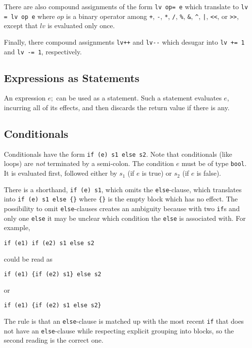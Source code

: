 \documentclass[11pt]{article}
\newcommand{\tbool}{\texttt{bool}}
\begin{document}
There are also compound assignments of the form
\lstinline'lv op= e' which translate to \lstinline'lv = lv op e'
where $op$ is a binary operator among \lstinline'+', \lstinline'-',
\lstinline'*', \lstinline'/', \lstinline'%', \lstinline'&', \lstinline'^', \lstinline'|',
\lstinline'<<', or \lstinline'>>', except that $lv$ is evaluated
only once.

Finally, there compound assignments \lstinline'lv++' and \lstinline'lv--'
which desugar into \lstinline'lv += 1' and \lstinline'lv -= 1',
respectively.

\subsection{Expressions as Statements}

An expression $e;$ can be used as a statement.  Such a
statement evaluates $e$, incurring all of its effects, and
then discards the return value if there is any.

\subsection{Conditionals}

Conditionals have the form \lstinline'if (e) s1 else s2'.
Note that conditionals (like loops) are \emph{not} terminated by
a semi-colon.  The condition $e$ must be of type \tbool.
It is evaluated first, followed either by $s_1$ (if $e$ is true)
or $s_2$ (if $e$ is false).

There is a shorthand, \lstinline'if (e) s1', which omits the
\lstinline'else'-clause, which translates into \lstinline'if (e) s1 else {}'
where \lstinline'{}' is the empty block which has no effect.  The
possibility to omit \lstinline'else'-clauses creates an ambiguity because
with two \lstinline'if's and only one \lstinline'else' it may be unclear which
condition the \lstinline'else' is associated with.  For example,
\begin{lstlisting}
if (e1) if (e2) s1 else s2
\end{lstlisting}
could be read as
\begin{lstlisting}
if (e1) {if (e2) s1} else s2
\end{lstlisting}
or
\begin{lstlisting}
if (e1) {if (e2) s1 else s2}
\end{lstlisting}
The rule is that an \lstinline'else'-clause is matched up with the most
recent \lstinline'if' that does not have an \lstinline'else'-clause while
respecting explicit grouping into blocks, so the second reading
is the correct one.
\end{document}
